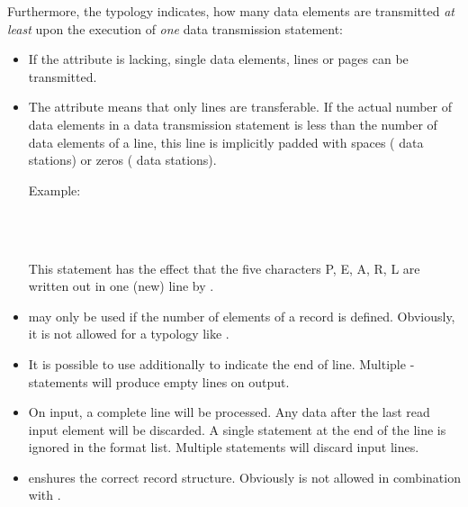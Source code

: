 \begin{modified}
Furthermore, the typology indicates, how many data elements are
transmitted {\em at least} upon the execution of {\em one} data
transmission statement:
\begin{itemize}
\item If the attribute  is lacking, single data elements,
lines or pages can be transmitted.
\item The  attribute 
 means that only lines are transferable.
If the actual number of data elements in a data transmission statement
is less than the number of data elements of a line, this line
 is implicitly padded with spaces ( data
stations) or zeros ( data stations).


Example:

\\
 \\

This  statement has the effect that the five characters P, E, A, R,
L are written out in one (new) line by .
\item {} may only be used if the number of elements of a record is defined. 
Obviously, it is not allowed for a typology like .
\item It is possible to use   additionally to indicate the end of line.
Multiple -statements will produce empty lines on output.
\item On input, a complete line will be processed.  Any data after the last
read input  element will be discarded. A single  statement at the end 
of the line is ignored in the format list. Multiple  statements will
discard input lines.
\item {} enshures the correct record structure. Obviously
 is not allowed in combination with .
\end{itemize}
\end{modified}

